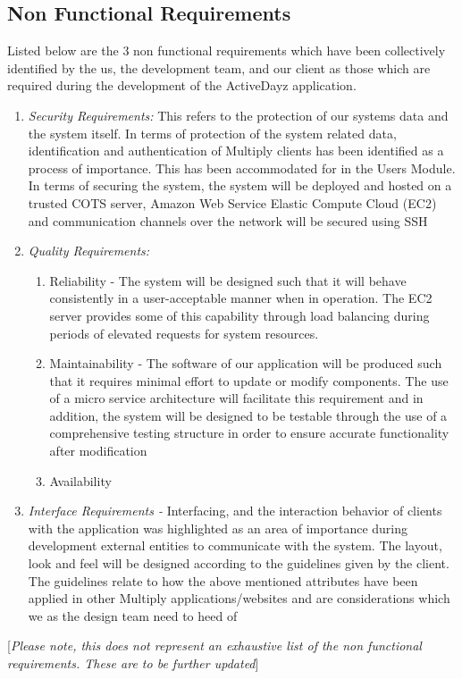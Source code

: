 \documentclass[11pt]{article}
\begin{document}
\subsection{Non Functional Requirements }
Listed below are the 3 non functional requirements which have been collectively identified by the us, the development team, and our client as those which are required during the development of the ActiveDayz application.
\begin{enumerate}
  \item \emph{Security Requirements:} This refers to the protection of our systems data and the system itself. In terms of protection of the system related data, identification and authentication of Multiply clients has been identified as a process of importance. This has been accommodated for in the Users Module. In terms of securing the system, the system will be deployed and hosted on a trusted COTS server, Amazon Web Service Elastic Compute Cloud (EC2) and communication channels over the network will be secured using SSH
  \item \emph{Quality Requirements:} 
	\begin{enumerate}
		\item Reliability - The system will be designed such that it will behave consistently in a user-acceptable manner when in operation. The EC2 server provides some of this capability through load balancing during periods of elevated requests for system resources. 
		\item Maintainability - The software of our application will be produced such that it requires minimal effort to update or modify components. The use of a micro service architecture will facilitate this requirement and in addition, the system will be designed to be testable through the use of a comprehensive testing structure in order to ensure accurate functionality after modification 
		\item Availability
	\end{enumerate}
	\item \emph{Interface Requirements -} Interfacing, and the interaction behavior of clients with the application was highlighted as an area of importance during development external entities to communicate with the system. The layout, look and feel will be designed according to the guidelines given by the client. The guidelines relate to how the above mentioned attributes have been applied in other Multiply applications/websites and are considerations which we as the design team need to heed of 

\end{enumerate}
[\textit{Please note, this does not represent an exhaustive list of the non functional requirements. These are to be further updated}]
\end{document}
